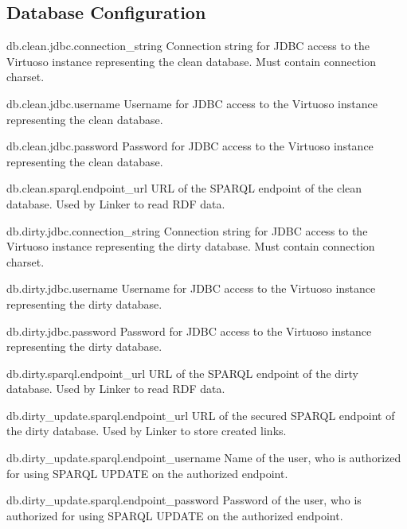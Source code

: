 \subsection*{Database Configuration}
\begin{configlist}
	\item[db.clean.jdbc.connection\_string]
	  Connection string for JDBC access to the Virtuoso instance representing the clean database. Must contain connection charset.
	\item[db.clean.jdbc.username]
	  Username for JDBC access to the Virtuoso instance representing the clean database.
	\item[db.clean.jdbc.password]
	  Password for JDBC access to the Virtuoso instance representing the clean database.
	\item[db.clean.sparql.endpoint\_url]
	  URL of the SPARQL endpoint of the clean database. Used by Linker to read RDF data.

	\item[db.dirty.jdbc.connection\_string]
		Connection string for JDBC access to the Virtuoso instance representing the dirty database. Must contain connection charset.
	\item[db.dirty.jdbc.username]
		Username for JDBC access to the Virtuoso instance representing the dirty database.
	\item[db.dirty.jdbc.password]
		Password for JDBC access to the Virtuoso instance representing the dirty database.
		
	\item[db.dirty.sparql.endpoint\_url]
		URL of the SPARQL endpoint of the dirty database. Used by Linker to read RDF data.
	\item[db.dirty\_update.sparql.endpoint\_url]
		URL of the secured SPARQL endpoint of the dirty database. Used by Linker to store created links.
	\item[db.dirty\_update.sparql.endpoint\_username]
		Name of the user, who is authorized for using SPARQL UPDATE on the authorized endpoint.
	\item[db.dirty\_update.sparql.endpoint\_password]
		Password of the user, who is authorized for using SPARQL UPDATE on the authorized endpoint.
\end{configlist}

